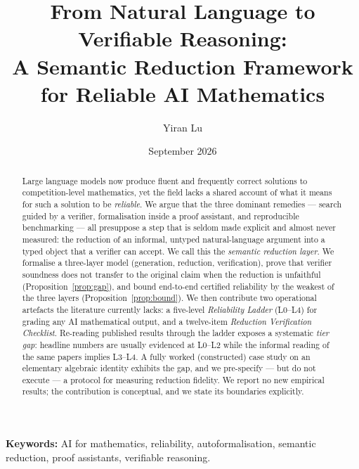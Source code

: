 \documentclass[11pt,a4paper]{article}
\theoremstyle{plain}
\theoremstyle{remark}
\begin{document}

\title{From Natural Language to Verifiable Reasoning:\\
       A Semantic Reduction Framework for Reliable AI Mathematics}

\author{Yiran Lu}
\date{September 2026}

\maketitle

\begin{abstract}
Large language models now produce fluent and frequently correct solutions to
competition-level mathematics, yet the field lacks a shared account of what it
means for such a solution to be \emph{reliable}.  We argue that the three
dominant remedies --- search guided by a verifier, formalisation inside a proof
assistant, and reproducible benchmarking --- all presuppose a step that is
seldom made explicit and almost never measured: the reduction of an informal,
untyped natural-language argument into a typed object that a verifier can
accept.  We call this the \emph{semantic reduction layer}.  We formalise a
three-layer model (generation, reduction, verification), prove that verifier
soundness does not transfer to the original claim when the reduction is
unfaithful (Proposition~\ref{prop:gap}), and bound end-to-end certified
reliability by the weakest of the three layers (Proposition~\ref{prop:bound}).
We then contribute two operational artefacts the literature currently lacks: a
five-level \emph{Reliability Ladder} (L0--L4) for grading any AI mathematical
output, and a twelve-item \emph{Reduction Verification Checklist}.  Re-reading
published results through the ladder exposes a systematic \emph{tier gap}:
headline numbers are usually evidenced at L0--L2 while the informal reading of
the same papers implies L3--L4.  A fully worked (constructed) case study on an
elementary algebraic identity exhibits the gap, and we pre-specify --- but do
not execute --- a protocol for measuring reduction fidelity.  We report no new
empirical results; the contribution is conceptual, and we state its boundaries
explicitly.
\end{abstract}

\noindent\textbf{Keywords:} AI for mathematics, reliability, autoformalisation,
semantic reduction, proof assistants, verifiable reasoning.
\end{document}
